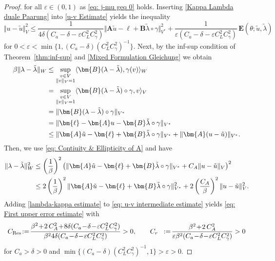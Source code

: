 \documentclass[12pt,twoside,reqno]{amsart}
\theoremstyle{definition}
\numberwithin{equation}{section}
\newcommand{\A} {\bm{A}}
\newcommand{\lin} {\bm{\ell}}
\newcommand{\B} {\bm{B}}
\newcommand{\norm}[1]    {\Vert #1 \Vert}
\begin{document}
\begin{proof}
        for all $\varepsilon\in (0,1)$ as \eqref{eq: j-mu geq 0} holds. Inserting \eqref{Kappa Lambda duale Paarung} into \eqref{u-v Estimate} yields the inequality
        \begin{equation}\label{eq: u-v intermediate estimate}
            \norm{u\!-\!\tilde{u}}_V^2 \leq \frac{1}{4\delta(C_a\!-\!\delta\!-\!\varepsilon  C_L^2C_{\gamma}^2) }\norm{\bm{A}\tilde{u}\!-\!\bm{\ell}\!+\!\B\tilde{\lambda}\circ\gamma}_{V^*}^2 +\frac{1}{\varepsilon( C_a\!-\!\delta\!-\!\varepsilon C_L^2C_{\gamma}^2)}\, \bm{E}(\theta;\tilde{u},\tilde{\lambda})
        \end{equation}
        for $0<\varepsilon<\min \{1,(C_a-\delta)(C_L^2C_{\gamma}^2)^{-1}\}$.
        Next, by the inf-sup condition of Theorem~\ref{thm:inf-sup} and \eqref{Mixed Formulation Gleichung} we obtain
        \begin{equation*}
            \aligned
                \beta \norm{\lambda-\tilde{\lambda}}_W & \leq \sup\limits_{\substack{v\in V\\ \norm{v}_V=1}}\langle \B(\lambda-\tilde{\lambda}),\gamma(v)\rangle_W\\
                &=\sup\limits_{\substack{v\in V\\ \norm{v}_V=1}}\langle \B(\lambda-\tilde{\lambda})\circ \gamma,v\rangle_V\\
                &= \norm{\B(\lambda-\tilde{\lambda})\circ\gamma}_{V^*}\\
                &=  \norm{\lin-\A u-\B\tilde{\lambda}\circ\gamma}_{V^*}\\
                &\leq \norm{\A \tilde{u}-\lin+\B\tilde{\lambda}\circ\gamma}_{V^*}+\norm{\A(u-\tilde{u})}_{V^*}.
            \endaligned
        \end{equation*}
        Then, we use \eqref{eq: Contiuity & Ellipticity of A} and have
        \begin{equation}\label{lambda-kappa estimate}
        \aligned
                \norm{\lambda-\tilde{\lambda}}_W^2 &\leq \left(\frac{1}{\beta}\right)^2 \bigl(\norm{\A \tilde{u}-\lin+\B\tilde{\lambda}\circ\gamma}_{V^*}+C_A\norm{u-\tilde{u}}_{V}\bigr)^2\\
                &\leq 2\left(\frac{1}{\beta}\right)^2\norm{\A \tilde{u}-\lin+\B\tilde{\lambda}\circ\gamma}_{V^*}^2+2\left(\frac{C_A}{\beta}\right)^2\norm{u-\tilde{u}}_V^2.
                \endaligned
        \end{equation}
        Adding \eqref{lambda-kappa estimate} to \eqref{eq: u-v intermediate estimate} yields \eqref{eq: First upper error estimate} with 
        \begin{equation*}
        \aligned
            C_{\text{Res}}\!&:=\!\frac{\beta^2\!+\!2\,C_A^2\!+\!8\delta(C_a\!-\!\delta\!-\!\varepsilon C_L^2C_\gamma^2)}{\beta^24\delta(C_a\!-\!\delta\!-\!\varepsilon  C_L^2C_{\gamma}^2 )} > 0,\qquad 
            C_r\!&:=\!\frac{\beta^2\!+\!2\,C_A^2}{\varepsilon \beta^2(C_a\!-\!\delta\!-\!\varepsilon  C_L^2C_{\gamma}^2)} > 0
        \endaligned
        \end{equation*}
        for $C_a>\delta>0$ and $\min\{(C_a-\delta)(C_L^2C_{\gamma}^2)^{-1},1\}>\varepsilon>0$.
    \end{proof}
\end{document}
